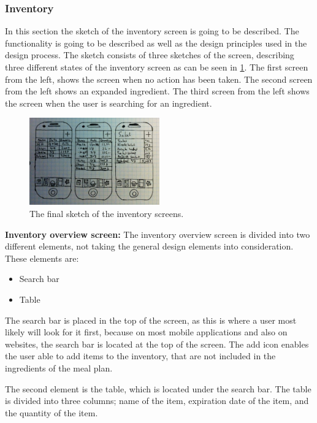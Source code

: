 \subsubsection{Inventory} \label{InventoryScreen}
In this section the sketch of the inventory screen is going to be described. The functionality is going to be described as well as the design principles used in the design process. The sketch consists of three sketches of the screen, describing three different states of the inventory screen as can be seen in \cref{FinalInventorySketch}. The first screen from the left, shows the screen when no action has been taken. The second screen from the left shows an expanded ingredient. The third screen from the left shows the screen when the user is searching for an ingredient.

\begin{figure}[H]
    \centering
    \includegraphics[width=0.5\textwidth]{Grafik/FoodPlanner/FinalInventorySketch}
    \caption{The final sketch of the inventory screens.}
    \label{FinalInventorySketch}
\end{figure}

\textbf{Inventory overview screen:} The inventory overview screen is divided into two different elements, not taking the general design elements into consideration. These elements are:

\begin{itemize}
    \item Search bar
    \item Table
\end{itemize}

The search bar is placed in the top of the screen, as this is where a user most likely will look for it first, because on most mobile applications and also on websites, the search bar is located at the
top of the screen. The add icon enables the user able to add items to the inventory, that are not included in the ingredients of the meal plan.

The second element is the table, which is located under the search bar. The table is divided into three columns; name of the item, expiration date of the item, and the quantity of the item.

